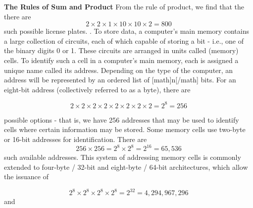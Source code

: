 \documentclass{article}
\begin{document}
{\begin{flushleft}{\bf{The Rules of Sum and Product}}
From the rule of product, we find that the there are \[ 2 \times 2 \times 1 \times 10 \times 10 \times 2 = 800 \] such possible license plates.
\linebreak
{}. To store data, a computer's main memory contains a large collection of circuits, each of which capable of storing a bit - i.e., one of the binary digits 0 or 1. These circuits are arranged in units called (memory) cells. To identify such a cell in a computer's main memory, each is assigned a unique name called its address. Depending on the type of the computer, an address will be represented by an ordered list of [math]n[/math] bits. For an eight-bit address (collectively referred to as a byte), there are 

\[ 2 \times 2 \times 2 \times 2 \times 2 \times 2 \times 2 \times 2 = 2^8 = 256 \]

possible options - that is, we have 256 addresses that may be used to identify cells where certain information may be stored. Some memory cells use two-byte or 16-bit addresses for identification. There are \[ 256 \times 256 = 2^8 \times 2^8 = 2^{16} = 65,536 \] such available addresses. This system of addressing memory cells is commonly extended to four-byte / 32-bit and eight-byte / 64-bit architectures, which allow the issuance of 

\[ 2^8 \times 2^8 \times 2^8 \times 2^8 = 2^{32} =4, 294, 967, 296 \] and


\end{flushleft}}
\end{document}
